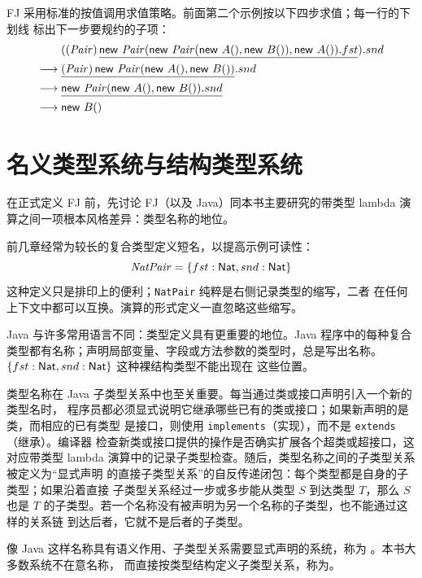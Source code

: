 FJ 采用标准的按值调用求值策略。前面第二个示例按以下四步求值；每一行的下划线
标出下一步要规约的子项：
\[
\begin{aligned}
&((\mathit{Pair})\,
  \taplredex{\mathsf{new}\ \mathit{Pair}
    (\mathsf{new}\ \mathit{Pair}(\mathsf{new}\ A(),\mathsf{new}\ B()),
     \mathsf{new}\ A()).fst}).snd\\
\trans{}&
  \taplredex{(\mathit{Pair})\,
    \mathsf{new}\ \mathit{Pair}(\mathsf{new}\ A(),\mathsf{new}\ B())}.snd\\
\trans{}&
  \taplredex{\mathsf{new}\ \mathit{Pair}
    (\mathsf{new}\ A(),\mathsf{new}\ B()).snd}\\
\trans{}&\mathsf{new}\ B()
\end{aligned}
\]

\section{名义类型系统与结构类型系统}
\label{sec:19.3}

在正式定义 FJ 前，先讨论 FJ（以及 Java）同本书主要研究的带类型 lambda
演算之间一项根本风格差异：类型名称的地位。

前几章经常为较长的复合类型定义短名，以提高示例可读性：
\[
\mathit{NatPair}=\{fst:\mathsf{Nat},snd:\mathsf{Nat}\}
\]
这种定义只是排印上的便利；\texttt{NatPair} 纯粹是右侧记录类型的缩写，二者
在任何上下文中都可以互换。演算的形式定义一直忽略这些缩写。

Java 与许多常用语言不同：类型定义具有更重要的地位。Java 程序中的每种复合
类型都有名称；声明局部变量、字段或方法参数的类型时，总是写出名称。
\(\{fst:\mathsf{Nat},snd:\mathsf{Nat}\}\) 这种裸结构类型不能出现在
这些位置。

类型名称在 Java 子类型关系中也至关重要。每当通过类或接口声明引入一个新的类型名时，
程序员都必须显式说明它继承哪些已有的类或接口；如果新声明的是类，而相应的已有类型
是接口，则使用 \texttt{implements}（实现），而不是 \texttt{extends}（继承）。编译器
检查新类或接口提供的操作是否确实扩展各个超类或超接口，这对应带类型 lambda
演算中的记录子类型检查。随后，类型名称之间的子类型关系被定义为“显式声明
的直接子类型关系”的自反传递闭包：每个类型都是自身的子类型；如果沿着直接
子类型关系经过一步或多步能从类型 \(S\) 到达类型 \(T\)，那么 \(S\) 也是 \(T\)
的子类型。若一个名称没有被声明为另一个名称的子类型，也不能通过这样的关系链
到达后者，它就不是后者的子类型。

像 Java 这样名称具有语义作用、子类型关系需要显式声明的系统，称为
。本书大多数系统不在意名称，
而直接按类型结构定义子类型关系，称为。

